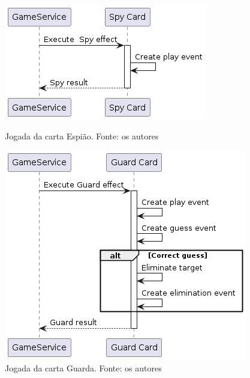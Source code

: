 \begin{figure}[h]
    \centering
    \begin{minipage}{0.48\textwidth}
        \centering
        \includegraphics[width=\textwidth]{diagrams/SpyCardPlay.png}
        \caption{Jogada da carta Espião. Fonte: os autores}
        \label{fig:spy-card-play}
    \end{minipage}
    \hfill
    \begin{minipage}{0.48\textwidth}
        \centering
        \includegraphics[width=\textwidth]{diagrams/GuardCardPlay.png}
        \caption{Jogada da carta Guarda. Fonte: os autores}
        \label{fig:guard-card-play}
    \end{minipage}
\end{figure}

